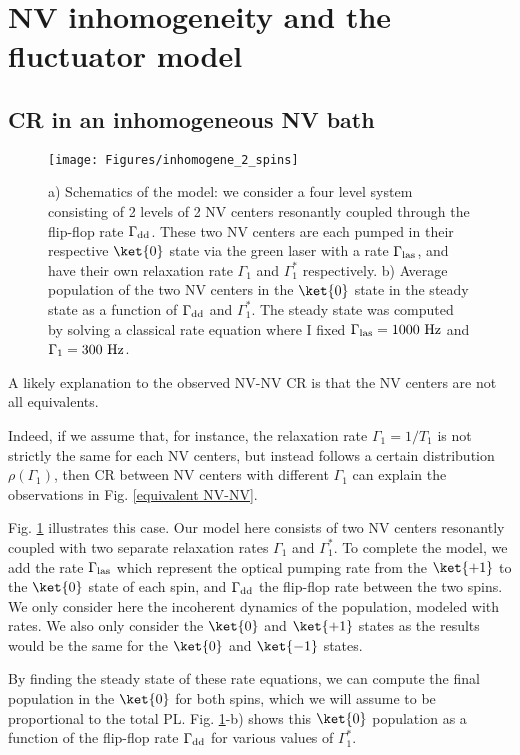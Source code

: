 \documentclass[a4paper,11pt]{report}
\begin{document}
\section{NV inhomogeneity and the fluctuator model}

\subsection{CR in an inhomogeneous NV bath}
\begin{figure}[h]
\centering
\texttt{[image: Figures/inhomogene\_2\_spins]}
\caption{a) Schematics of the model: we consider a four level system consisting of 2 levels of 2 NV centers resonantly coupled through the flip-flop rate $\Gamma_{\rm dd}$. These two NV centers are each pumped in their respective $\ket{0}$ state via the green laser with a rate $\Gamma_{\rm las}$, and have their own relaxation rate $\Gamma_1$ and $\Gamma_1^*$ respectively. b) Average population of the two NV centers in the $\ket{0}$ state in the steady state as a function of $\Gamma_{\rm dd}$ and $\Gamma_1^*$. The steady state was computed by solving a classical rate equation where I fixed $\Gamma_{\rm las}=1000\ \rm Hz$ and $\Gamma_1=300\ \rm Hz$.}
\label{inhomogene}
\end{figure}
A likely explanation to the observed NV-NV CR is that the NV centers are not all equivalents.

Indeed, if we assume that, for instance, the relaxation rate $\Gamma_1=1/T_1$ is not strictly the same for each NV centers, but instead follows a certain distribution $\rho(\Gamma_1)$, then CR between NV centers with different $\Gamma_1$ can explain the observations in Fig. \ref{equivalent NV-NV}.

Fig. \ref{inhomogene} illustrates this case. Our model here consists of two NV centers resonantly coupled with two separate relaxation rates $\Gamma_1$ and $\Gamma_1^*$. To complete the model, we add the rate $\Gamma_{\rm las}$ which represent the optical pumping rate from the $\ket{+1}$ to the $\ket{0}$ state of each spin, and $\Gamma_{\rm dd}$ the flip-flop rate between the two spins. We only consider here the incoherent dynamics of the population, modeled with rates. We also only consider the $\ket{0}$ and $\ket{+1}$ states as the results would be the same for the $\ket{0}$ and $\ket{-1}$ states. 

By finding the steady state of these rate equations, we can compute the final population in the $\ket{0}$ for both spins, which we will assume to be proportional to the total PL. Fig. \ref{inhomogene}-b) shows this $\ket{0}$ population as a function of the flip-flop rate $\Gamma_{\rm dd}$ for various values of $\Gamma_1^*$.
\end{document}
